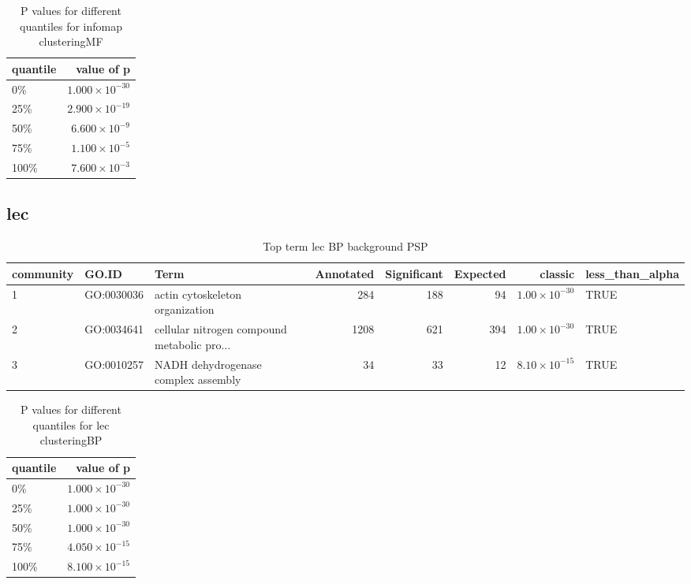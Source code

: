 \begin{table}[ht]
\centering
\begin{tabular}{lr}
  \hline
quantile & value of p \\ 
  \hline
0\% & $1.000 \times 10^{-30}$ \\ 
  25\% & $2.900 \times 10^{-19}$ \\ 
  50\% & $6.600 \times 10^{-9}$ \\ 
  75\% & $1.100 \times 10^{-5}$ \\ 
  100\% & $7.600 \times 10^{-3}$ \\ 
   \hline
\end{tabular}
\caption{P values for different quantiles for infomap clusteringMF} 
\label{tabP values for different quantiles for infomap clusteringMF}
\end{table}

\subsection{lec}

\begin{table}[ht]
\centering
\begin{adjustbox}{max width=\textwidth}
\begin{tabular}{lllrrrrl}
  \hline
community & GO.ID & Term & Annotated & Significant & Expected & classic & less\_than\_alpha \\ 
  \hline
1 & GO:0030036 & actin cytoskeleton organization & 284 & 188 & 94 & $1.00 \times 10^{-30}$ & TRUE \\ 
  2 & GO:0034641 & cellular nitrogen compound metabolic pro... & 1208 & 621 & 394 & $1.00 \times 10^{-30}$ & TRUE \\ 
  3 & GO:0010257 & NADH dehydrogenase complex assembly & 34 & 33 & 12 & $8.10 \times 10^{-15}$ & TRUE \\ 
   \hline
\end{tabular}
\end{adjustbox}
\caption{Top term  lec BP background PSP} 
\label{tab:Top term  lec BP background PSP}
\end{table}

\begin{table}[ht]
\centering
\begin{tabular}{lr}
  \hline
quantile & value of p \\ 
  \hline
0\% & $1.000 \times 10^{-30}$ \\ 
  25\% & $1.000 \times 10^{-30}$ \\ 
  50\% & $1.000 \times 10^{-30}$ \\ 
  75\% & $4.050 \times 10^{-15}$ \\ 
  100\% & $8.100 \times 10^{-15}$ \\ 
   \hline
\end{tabular}
\caption{P values for different quantiles for lec clusteringBP} 
\label{tabP values for different quantiles for lec clusteringBP}
\end{table}

